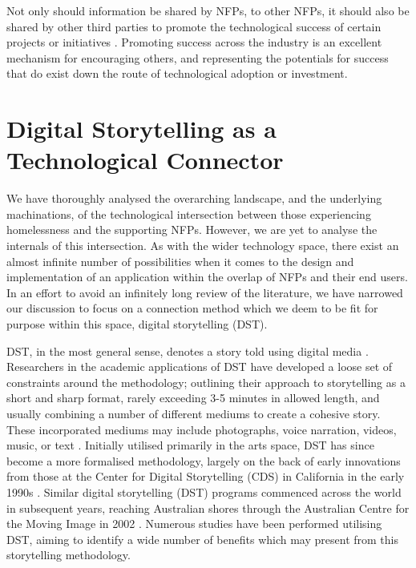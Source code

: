 Not only should information be shared by NFPs, to other NFPs, it should also be shared by other third parties to promote the technological success of certain projects or initiatives \cite{van2015open}. Promoting success across the industry is an excellent mechanism for encouraging others, and representing the potentials for success that do exist down the route of technological adoption or investment.

\section{Digital Storytelling as a Technological Connector}

We have thoroughly analysed the overarching landscape, and the underlying machinations, of the technological intersection between those experiencing homelessness and the supporting NFPs. However, we are yet to analyse the internals of this intersection. As with the wider technology space, there exist an almost infinite number of possibilities when it comes to the design and implementation of an application within the overlap of NFPs and their end users. In an effort to avoid an infinitely long review of the literature, we have narrowed our  discussion to focus on a connection method which we deem to be fit for purpose within this space, digital storytelling (DST).

DST, in the most general sense, denotes a story told using digital media \cite{de2017digital}. Researchers in the academic applications of DST have developed a loose set of constraints around the methodology; outlining their approach to storytelling as a short and sharp format, rarely exceeding 3-5 minutes in allowed length, and usually combining a number of different mediums to create a cohesive story. These incorporated mediums may include photographs, voice narration, videos, music, or text \cite{gubrium2014situated}. Initially utilised primarily in the arts space, DST has since become a more formalised methodology, largely on the back of early innovations from those at the Center for Digital Storytelling (CDS) in California in the early 1990s \cite{lambert2009all}. Similar digital storytelling (DST) programs commenced across the world in subsequent years, reaching Australian shores through the Australian Centre for the Moving Image in 2002 \cite{hartley2009story}. Numerous studies have been performed utilising DST, aiming to identify a wide number of benefits which may present from this storytelling methodology.

